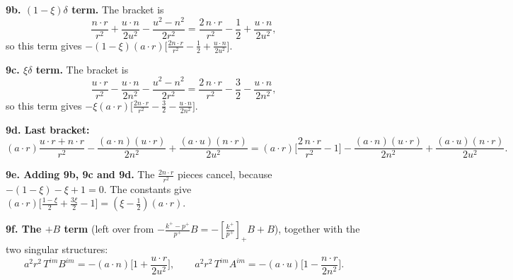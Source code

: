\documentclass[10pt]{article}
\numberwithin{equation}{section}
\begin{document}
\textbf{9b. $(1-\xi)\delta$ term.} The bracket is
\begin{equation}
\frac{n\cdot r}{r^{2}}+\frac{u\cdot n}{2u^{2}}-\frac{u^{2}-n^{2}}{2r^{2}}=\frac{2\,n\cdot r}{r^{2}}-\frac12+\frac{u\cdot n}{2u^{2}},
\end{equation}
so this term gives $-(1-\xi)(a\cdot r)\big[\frac{2n\cdot r}{r^{2}}-\frac12+\frac{u\cdot n}{2u^{2}}\big]$.

\textbf{9c. $\xi\delta$ term.} The bracket is
\begin{equation}
\frac{u\cdot r}{r^{2}}-\frac{u\cdot n}{2n^{2}}-\frac{u^{2}-n^{2}}{2r^{2}}=\frac{2\,n\cdot r}{r^{2}}-\frac32-\frac{u\cdot n}{2n^{2}},
\end{equation}
so this term gives $-\xi(a\cdot r)\big[\frac{2n\cdot r}{r^{2}}-\frac32-\frac{u\cdot n}{2n^{2}}\big]$.

\textbf{9d. Last bracket:}
\begin{equation}
(a\cdot r)\frac{u\cdot r+n\cdot r}{r^{2}}-\frac{(a\cdot n)(u\cdot r)}{2n^{2}}+\frac{(a\cdot u)(n\cdot r)}{2u^{2}}
=(a\cdot r)\Big[\frac{2\,n\cdot r}{r^{2}}-1\Big]-\frac{(a\cdot n)(u\cdot r)}{2n^{2}}+\frac{(a\cdot u)(n\cdot r)}{2u^{2}}.
\end{equation}

\textbf{9e. Adding 9b, 9c and 9d.} The $\frac{2n\cdot r}{r^{2}}$ pieces cancel, because $-(1-\xi)-\xi+1=0$. The constants give $(a\cdot r)\big[\frac{1-\xi}{2}+\frac{3\xi}{2}-1\big]=(\xi-\frac12)(a\cdot r)$.

\textbf{9f. The $+B$ term} (left over from $-\frac{k^{+}-p^{+}}{p^{+}}B=-[\frac{k^{+}}{p^{+}}]_{+}B+B$), together with the two singular structures:
\begin{equation}
a^{2}r^{2}\,T^{im}B^{im}=-(a\cdot n)\Big[1+\frac{u\cdot r}{2u^{2}}\Big],\qquad
a^{2}r^{2}\,T^{im}A^{im}=-(a\cdot u)\Big[1-\frac{n\cdot r}{2n^{2}}\Big].
\end{equation}
\end{document}
